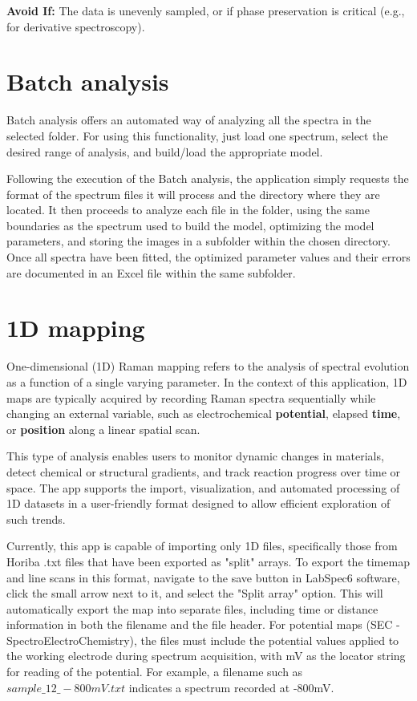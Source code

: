 \textbf{Avoid If:}  
The data is unevenly sampled, or if phase preservation is critical (e.g., for derivative spectroscopy).

\section{Batch analysis}
Batch analysis offers an automated way of analyzing all the spectra in the selected folder. For using this functionality, just load one spectrum, select the desired range of analysis, and build/load the appropriate model. 

Following the execution of the Batch analysis, the application simply requests the format of the spectrum files it will process and the directory where they are located. It then proceeds to analyze each file in the folder, using the same boundaries as the spectrum used to build the model, optimizing the model parameters, and storing the images in a subfolder within the chosen directory. Once all spectra have been fitted, the optimized parameter values and their errors are documented in an Excel file within the same subfolder.

\section{1D mapping}

One-dimensional (1D) Raman mapping refers to the analysis of spectral evolution as a function of a single varying parameter. In the context of this application, 1D maps are typically acquired by recording Raman spectra sequentially while changing an external variable, such as electrochemical \textbf{potential}, elapsed \textbf{time}, or \textbf{position} along a linear spatial scan.

This type of analysis enables users to monitor dynamic changes in materials, detect chemical or structural gradients, and track reaction progress over time or space. The app supports the import, visualization, and automated processing of 1D datasets in a user-friendly format designed to allow efficient exploration of such trends.

Currently, this app is capable of importing only 1D files, specifically those from Horiba .txt files that have been exported as "split" arrays. To export the timemap and line scans in this format, navigate to the save button in LabSpec6 software, click the small arrow next to it, and select the "Split array" option. This will automatically export the map into separate files, including time or distance information in both the filename and the file header. For potential maps (SEC - SpectroElectroChemistry), the files must include the potential values applied to the working electrode during spectrum acquisition, with mV as the locator string for reading of the potential. For example, a filename such as \textit{$sample\_12\_-800mV.txt$} indicates a spectrum recorded at -800mV.


